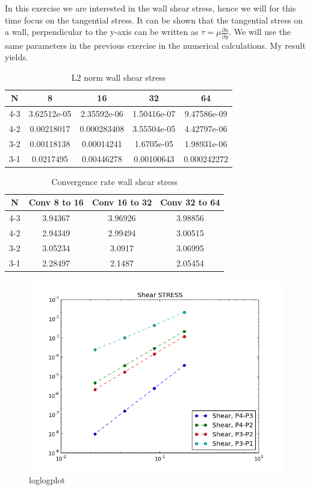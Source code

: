 \documentclass[a4paper,norsk]{article}
\begin{document}
In this exercise we are interested in the wall shear stress, hence we will for this time focus on the tangential stress.
It can be shown that the tangential stress on a wall, perpendicular to the y-axis can be written as 
$\tau = \mu \frac{\partial u}{\partial y}$. We will use the same parameters in the previous exercise in the numerical
calculations. My result yields.
\begin{table}[ht]
\caption {L2 norm wall shear stress} 
\centering
\begin{tabular}{c|cccc}
\hline
\rowcolor{LightCyan}
N  &  8  &  16  &  32 &  64\\
\hline
4-3 & 3.62512e-05 & 2.35592e-06 & 1.50416e-07 & 9.47586e-09 \\ \hline
4-2 & 0.00218017  & 0.000283408 & 3.55504e-05 & 4.42797e-06 \\ \hline
3-2 & 0.00118138  & 0.00014241  & 1.6705e-05  & 1.98931e-06 \\ \hline
3-1 & 0.0217495   & 0.00446278  & 0.00100643  & 0.000242272 \\
\hline
\end{tabular}
\end{table}
\begin{table}[ht]
\caption {Convergence rate wall shear stress} 
\centering
\begin{tabular}{c|ccc}
\hline
\rowcolor{LightCyan}
N  & Conv 8 to 16  &  Conv 16 to 32 &  Conv 32 to 64 \\
\hline
4-3 & 3.94367 & 3.96926 & 3.98856   \\ \hline
4-2 & 2.94349 & 2.99494 & 3.00515  \\ \hline
3-2 & 3.05234 & 3.0917  & 3.06995  \\ \hline
3-1 & 2.28497 & 2.1487  & 2.05454  \\
\hline
\end{tabular}
\end{table}
\begin{figure}[h!]
        \centering
        \caption*{loglogplot}
        \includegraphics[scale=0.4]{shear.png}
\end{figure}
\end{document}
